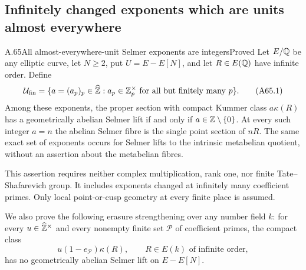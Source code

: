 \subsection{Infinitely changed exponents which are units almost everywhere}

\begin{statement}{A.65}{All almost-everywhere-unit Selmer exponents are integers}{Proved}
Let $E/\mathbb Q$ be any elliptic curve, let $N\ge2$, put
$U=E-E[N]$, and let $R\in E(\mathbb Q)$ have infinite order. Define
\[
 \mathcal U_{\rm fin}=
 \{a=(a_p)_p\in\widehat{\mathbb Z}:
           a_p\in\mathbb Z_p^\times\text{ for all but finitely many }p\}.
 \tag{A65.1}
\]
Among these exponents, the proper section with compact Kummer
class $a\kappa(R)$ has a geometrically abelian Selmer lift if and
only if $a\in\mathbb Z\setminus\{0\}$. At every such integer $a=n$
the abelian Selmer fibre is the single point section of $nR$.
The same exact set of exponents occurs for Selmer lifts to the
intrinsic metabelian quotient, without an assertion about the
metabelian fibres.

This assertion requires neither complex multiplication, rank one,
nor finite Tate--Shafarevich group. It includes exponents changed
at infinitely many coefficient primes. Only local point-or-cusp
geometry at every finite place is assumed.

We also prove the following erasure strengthening over any number
field $k$: for every $u\in\widehat{\mathbb Z}^\times$ and every nonempty
finite set $\mathcal P$ of coefficient primes, the compact class
\[
 u(1-e_{\mathcal P})\kappa(R),\qquad R\in E(k)
                 \text{ of infinite order},
 \tag{A65.2}
\]
has no geometrically abelian Selmer lift on $E-E[N]$.
\end{statement}
